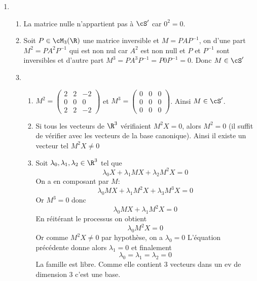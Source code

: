 \begin{correction}
\begin{enumerate}
\begin{enumerate}
\end{enumerate}
\item 
\begin{enumerate}
\item La matrice nulle n'appartient pas à $\cS'$ car $0^2=0$. 
\item Soit $P\in \cM_3(\R)$  une matrice inversible et $M=P A P^{-1} $, on  d'une part
$M^2 = PA^2P^{-1} $ qui est non nul car $A^2$ est non null et $P$ et $P^{-1}$ sont inversibles  et d'autre part  $M^3 =PA^3 P^{-1} = P 0 P^{-1} =0$. Donc $M \in \cS'$
\item \begin{enumerate}
\item $M^2 =\left(\begin{array}{ccc}
2&2&-2\\
0&0&0\\
2&2&-2
\end{array}
\right)  $  et $M^3 = \left(\begin{array}{ccc}
0&0&0\\
0&0&0\\
0&0&0
\end{array}
\right)  $. Ainsi $M\in \cS'$. 
\item Si tous les vecteurs de $\R^3$ vérifiaient $M^2X=0$, alors $M^2 = 0$ (il suffit de vérifier avec les vecteurs de la base canonique). Ainsi il existe un vecteur tel $M^2X\neq 0$
\item Soit $\lambda_0,\lambda_1,\lambda_2\in \R^3$ tel que  
$$\lambda_0 X +\lambda_1 M X +\lambda_2 M^2 X= 0$$
On a en composant par $M:$
$$\lambda_0 M X +\lambda_1 M^2 X +\lambda_3 M^3 X=0$$
Or $M^3 =0 $ donc 
$$\lambda_0 M X +\lambda_1 M^2 X=0$$
En réitérant le processus on obtient 
$$\lambda_0 M^2 X =0  $$
Or comme $M^2X \neq 0$ par hypothèse, on a $\lambda_0=0$ 
L'équation précédente donne alors $\lambda_1=0$ et finalement 
$$\lambda_0=\lambda_1 =\lambda_2 =0$$
La famille est libre. Comme elle contient 3 vecteurs dans un ev de dimension $3$ c'est une base. 


\end{enumerate}
\end{enumerate}

\end{enumerate}
\end{correction}







